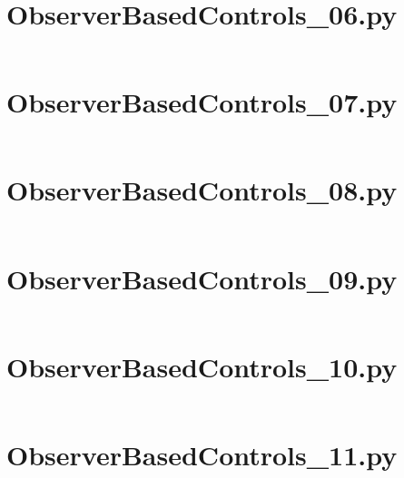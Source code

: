 \pagebreak
\section*{ObserverBasedControls\_06.py}\label{code:TSatPySamples/ObserverBasedControls_06.py}\inputminted[linenos,fontsize=\scriptsize]{python}{/home/dcouture/git/mathyourlife/TSatPy/tex/sample_scripts/ObserverBasedControls_06.py}

\pagebreak
\section*{ObserverBasedControls\_07.py}\label{code:TSatPySamples/ObserverBasedControls_07.py}\inputminted[linenos,fontsize=\scriptsize]{python}{/home/dcouture/git/mathyourlife/TSatPy/tex/sample_scripts/ObserverBasedControls_07.py}

\pagebreak
\section*{ObserverBasedControls\_08.py}\label{code:TSatPySamples/ObserverBasedControls_08.py}\inputminted[linenos,fontsize=\scriptsize]{python}{/home/dcouture/git/mathyourlife/TSatPy/tex/sample_scripts/ObserverBasedControls_08.py}

\pagebreak
\section*{ObserverBasedControls\_09.py}\label{code:TSatPySamples/ObserverBasedControls_09.py}\inputminted[linenos,fontsize=\scriptsize]{python}{/home/dcouture/git/mathyourlife/TSatPy/tex/sample_scripts/ObserverBasedControls_09.py}

\pagebreak
\section*{ObserverBasedControls\_10.py}\label{code:TSatPySamples/ObserverBasedControls_10.py}\inputminted[linenos,fontsize=\scriptsize]{python}{/home/dcouture/git/mathyourlife/TSatPy/tex/sample_scripts/ObserverBasedControls_10.py}

\pagebreak
\section*{ObserverBasedControls\_11.py}\label{code:TSatPySamples/ObserverBasedControls_11.py}\inputminted[linenos,fontsize=\scriptsize]{python}{/home/dcouture/git/mathyourlife/TSatPy/tex/sample_scripts/ObserverBasedControls_11.py}

